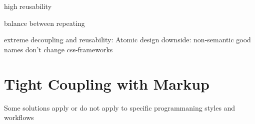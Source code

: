 high reusability

balance between repeating 

extreme decoupling and reusability: Atomic design
downside: non-semantic
good names don't change
css-frameworks

\section{Tight Coupling with Markup}
Some solutions apply or do not apply to specific programmaning styles and workflows
